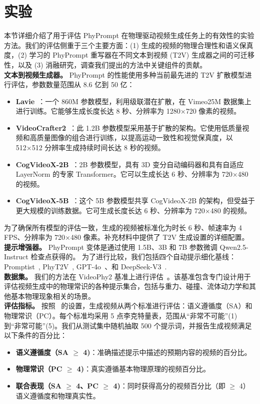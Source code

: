\section{实验}

本节详细介绍了用于评估 PhyPrompt 在物理驱动视频生成任务上的有效性的实验方法。我们的评估侧重于三个主要方面：(1) 生成的视频的物理合理性和语义保真度，(2) 学习的 PhyPrompt 重写器在不同文本到视频 (T2V) 生成器之间的可迁移性，以及 (3) 消融研究，调查我们提出的方法中关键组件的贡献。
\\
\textbf{文本到视频生成器。}
PhyPrompt 的性能使用多种当前最先进的 T2V 扩散模型进行评估，参数数量范围从 8.6 亿到 50 亿：

\begin{itemize}
\item \textbf{Lavie}~\cite{wang2023lavie}：一个 860M 参数模型，利用级联潜在扩散，在 Vimeo25M 数据集上进行训练。它能够生成长度长达 8 秒、分辨率为 1280×720 像素的视频。
\item \textbf{VideoCrafter2}~\cite{chen2024videocrafter2}：此 1.2B 参数模型采用基于扩散的架构。它使用低质量视频和高质量图像的组合进行训练，以提高运动一致性和视觉保真度，以 512×512 分辨率生成持续时间长达 8 秒的视频。
\item \textbf{CogVideoX-2B}~\cite{yang2024cogvideox}：2B 参数模型，具有 3D 变分自动编码器和具有自适应 LayerNorm 的专家 Transformer。它可以生成长达 6 秒、分辨率为 720×480 的视频。
\item \textbf{CogVideoX-5B}~\cite{yang2024cogvideox}：这个 5B 参数模型共享 CogVideoX-2B 的架构，但受益于更大规模的训练数据。它可生成长度长达 6 秒、分辨率为 720×480 的视频。
\end{itemize}
为了确保所有模型的评估一致，生成的视频被标准化为时长 6 秒、帧速率为 4 FPS、分辨率为 720×480 像素。补充材料中提供了 T2V 生成设置的详细配置。
\\
\textbf{提示增强器。}
PhyPrompt 变体是通过使用 1.5B、3B 和 7B 参数微调 Qwen2.5-Instruct 检查点获得的。
为了进行比较，我们包括四个自动提示细化基线：Promptist~\cite{hao2023promptist}, PhyT2V~\cite{xue2024phyt2v}, GPT-4o~\cite{achiam2023gpt-4o}、和 DeepSeek-V3~\cite{liu2024deepseek-v3}.
\\
\textbf{数据集。}
我们的方法在 VideoPhy2 基准上进行评估~\cite{bansal2025videophy2}。该基准包含专门设计用于评估视频生成中的物理常识的各种提示集合，包括与重力、碰撞、流体动力学和其他基本物理现象相关的场景。
\\
\textbf{评估指标。}
按照~\cite{bansal2025videophy2} 的设置，生成视频从两个标准进行评估：语义遵循度（SA）和物理常识（PC）。每个标准均采用 5 点李克特量表，范围从“非常不可能”(1) 到“非常可能”(5)。我们从测试集中随机抽取 500 个提示词，并报告生成视频满足以下条件的百分比：
\begin{itemize}
\item \textbf{语义遵循度（SA $\geq$ 4)}：准确描述提示中描述的预期内容的视频的百分比。
\item \textbf{物理常识（PC $\geq$ 4)}：真实遵循基本物理原理的视频百分比。
\item \textbf{联合表现（SA $\geq$  4、PC $\geq$  4)}：同时获得高分的视频百分比（即 $\geq$ 4）语义遵循度和物理真实性。
\end{itemize}

